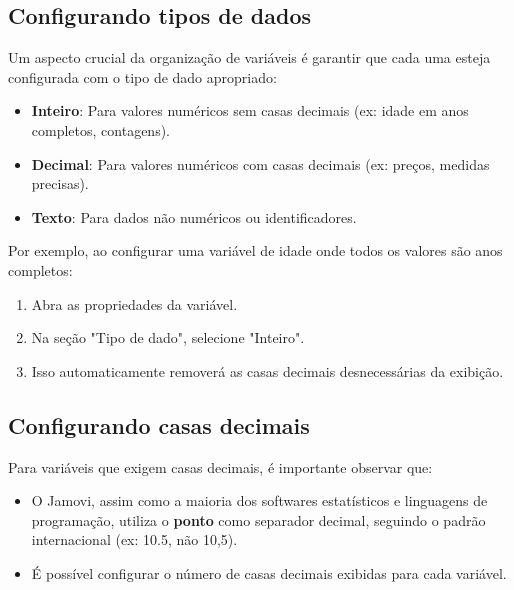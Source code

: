 
\subsection{Configurando tipos de dados}

Um aspecto crucial da organização de variáveis é garantir que cada uma esteja configurada com o tipo de dado apropriado:

\begin{itemize}
    \item \textbf{Inteiro}: Para valores numéricos sem casas decimais (ex: idade em anos completos, contagens).
    \item \textbf{Decimal}: Para valores numéricos com casas decimais (ex: preços, medidas precisas).
    \item \textbf{Texto}: Para dados não numéricos ou identificadores.
\end{itemize}

Por exemplo, ao configurar uma variável de idade onde todos os valores são anos completos:

\begin{enumerate}
    \item Abra as propriedades da variável.
    \item Na seção "Tipo de dado", selecione "Inteiro".
    \item Isso automaticamente removerá as casas decimais desnecessárias da exibição.
\end{enumerate}

\subsection{Configurando casas decimais}

Para variáveis que exigem casas decimais, é importante observar que:

\begin{itemize}
    \item O Jamovi, assim como a maioria dos softwares estatísticos e linguagens de programação, utiliza o \textbf{ponto} como separador decimal, seguindo o padrão internacional (ex: 10.5, não 10,5).
    \item É possível configurar o número de casas decimais exibidas para cada variável.
\end{itemize}


